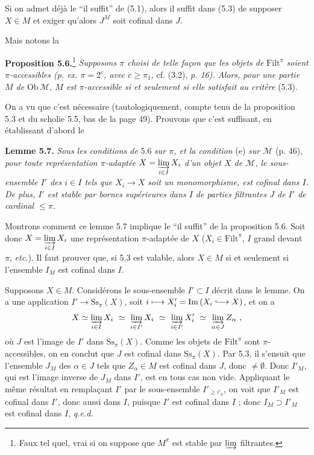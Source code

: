\documentclass[11pt]{article}
\newcommand{\printedpage}[1]{\marginpar{\footnotesize p.~#1}}
\newcommand{\msp}[1]{\marginpar{\footnotesize [#1]}}
\newcommand{\cM}{\mathcal{M}}
\newcommand{\Filt}{\mathrm{Filt}}
\newcommand{\Ss}{\mathrm{Ss}}
\newcommand{\Ob}{\mathrm{Ob}\,}
\newcommand{\Img}{\mathrm{Im}\,}
\newcommand{\hookto}{\lhook\joinrel\longrightarrow}
\begin{document}
Si on admet déjà le ``il suffit'' de (5.1), alors il suffit dans (5.3) de supposer $X \in M$ et exiger qu'alors $J^{M}$ soit cofinal dans $J$.

Mais notons la
\msp{page 52}

\textbf{Proposition 5.6.}\footnote[21]{Faux tel quel, vrai si on suppose que $M^{\pi}$ est stable par $\varinjlim$ filtrantes.} \textit{Supposons $\pi$ choisi de telle façon que les objets de} $\Filt^{\pi}$ \textit{soient $\pi$-accessibles (p. ex. $\pi = 2^{c}$, avec $c \geq \pi_1$,} cf. (3.2), \textit{p. 16). Alors, pour une partie $M$ de} $\Ob\cM$\textit{, $M$ est $\pi$-accessible si et seulement si elle satisfait au critère} (5.3).

On a vu que c'est nécessaire (tautologiquement, compte tenu de la proposition 5.3 et du scholie 5.5, bas de la page 49). Prouvons que c'est suffisant, en établissant d'abord le

\textbf{Lemme 5.7.} \textit{Sous les conditions de} 5.6 \textit{sur $\pi$, et la condition} (e) \textit{sur $\cM$} (p. 46), \textit{pour toute représentation $\pi$-adaptée $X = \varinjlim\limits_{i\in I} X_i$ d'un objet $X$ de $\cM$, le sous-ensemble $I'$ des $i \in I$ tels que $X_i \longrightarrow X$ soit un monomorphisme, est cofinal dans $I$. De plus, $I'$ est stable par bornes supérieures dans $I$ de parties filtrantes $J$ de $I'$ de cardinal $\leq \pi$.}

Montrons comment ce lemme 5.7 implique le ``il suffit'' de la proposition 5.6. Soit donc $X = \varinjlim\limits_{i\in I} X_i$ une représentation $\pi$-adaptée de $X$ ($X_i \in \Filt^{\pi}$, $I$ grand devant $\pi$, \textit{etc.}). Il faut prouver que, si 5.3 est valable, alors $X \in M$ si et seulement si l'ensemble $I_M$ est cofinal dans $I$.

\msp{page 53}
Supposons $X \in M$. Considérons le sous-ensemble $I' \subset I$ décrit dans le lemme. On a une application $I' \longrightarrow \Ss_{\pi}(X)$, soit $i \longmapsto X'_i = \Img (X_i \hookto X)$, et on a
\[
X \simeq \varinjlim_{i\in I} X_i \ \simeq \ \varinjlim_{i\in I'} X_i \ \simeq \ \varinjlim_{i\in I'} X'_i \ \simeq \ \varinjlim_{\alpha\in J} Z_{\alpha} \ ,
\]
où $J$ est l'image de $I'$ dans $\Ss_{\pi}(X)$. Comme les objets de $\Filt^{\pi}$ sont $\pi$-accessibles, on en conclut que $J$ est cofinal dans $\Ss_{\pi}(X)$. Par 5.3, il s'ensuit que l'ensemble $J_M$ des $\alpha \in J$
\printedpage{33}
tels que $Z_{\alpha} \in M$ est cofinal dans $J$, donc $\neq \emptyset$. Donc $I'_M$, qui est l'image inverse de $J_M$ dans $I'$, est en tous cas non vide. Appliquant le même résultat en remplaçant $I'$ par le sous-ensemble $I'_{\geq i'_0}$, on voit que $I'_M$ est cofinal dans $I'$, donc aussi dans $I$, puisque $I'$ est cofinal dans $I$ ; donc $I_M \supset I'_M$ est cofinal dans $I$, \quad \textit{q.e.d.}
\end{document}
